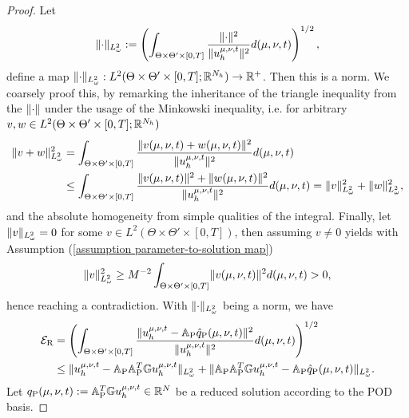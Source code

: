 \begin{proof}
    Let 
    \begin{equation*}
        \lVert \cdot \rVert_{L^2_\omega} := \left(\int_{\Theta \times \Theta' \times [0, T]} \frac{\lVert \cdot \rVert^2}{\lVert u_h^{\mu, \nu, t} \rVert^2} 
        d(\mu, \nu, t) \right)^{1/2},
    \end{equation*}
    define a map $\lVert \cdot \rVert_{L^2_\omega}: L^2(\Theta \times \Theta' \times [0, T]; \mathbb{R}^{N_h}) \to \mathbb{R}^+$. Then this is
    a norm. We coarsely proof this, by remarking the inheritance of the triangle inequality from the $\lVert \cdot \rVert$ under 
    the usage of the Minkowski inequality, i.e. for arbitrary $v, w \in L^2(\Theta \times \Theta' \times [0, T]; \mathbb{R}^{N_h})$
    \begin{align*}
        \lVert v + w \rVert_{L^2_\omega}^2 &= \int_{\Theta \times \Theta' \times [0, T]} 
        \frac{\lVert v(\mu, \nu, t) + w(\mu, \nu, t) \rVert^2}{\lVert u_h^{\mu, \nu, t} \rVert^2}
        d(\mu, \nu, t) \\
        &\leq  \int_{\Theta \times \Theta' \times [0, T]} 
        \frac{\lVert v(\mu, \nu, t) \rVert^2 + \lVert w(\mu, \nu, t) \rVert^2}{\lVert u_h^{\mu, \nu, t} \rVert^2}
        d(\mu, \nu, t) = \lVert v \rVert_{L^2_\omega}^2 + \lVert w \rVert_{L^2_\omega}^2,
    \end{align*}
    and the absolute homogeneity from simple qualities of the integral. Finally, let
    $\lVert v \rVert_{L^2_\omega} = 0$ for some $v \in L^2(\Theta \times \Theta' \times [0, T])$, then assuming $v \neq 0$ 
    yields with Assumption (\ref{assumption parameter-to-solution map})
    \begin{equation*}
        \lVert v \rVert_{L^2_\omega}^2 \geq  M^{-2} \int_{\Theta \times \Theta' \times [0, T]} \lVert v(\mu, \nu, t) \rVert^2 d(\mu, \nu, t) 
        > 0,
    \end{equation*}
    hence reaching a contradiction.
    With $\lVert  \cdot  \rVert_{L^2_\omega}$ being a norm, we have
    \begin{align}
        \mathcal{E}_\text{R} &= \left( \int_{\Theta \times \Theta' \times [0, T]} 
        \frac{\lVert u_h^{\mu, \nu, t} - \mathbb{A}_\text{P} \hat{q}_\text{P}(\mu, \nu, t) \rVert^2}{\lVert u_h^{\mu, \nu, t} \rVert^2} d(\mu, \nu, t) \right)^{1/2} \\ 
        \label{eq: decomposed errors poddnn}
        &\leq \lVert u_h^{\mu, \nu, t} - \mathbb{A}_\text{P} \mathbb{A}_\text{P}^T \mathbb{G} u_h^{\mu, \nu, t} \rVert_{L_\omega^2} + \lVert \mathbb{A}_\text{P} \mathbb{A}_\text{P}^T \mathbb{G} u_h^{\mu, \nu, t} - 
        \mathbb{A}_\text{P} \hat{q}_\text{P}(\mu, \nu, t) \rVert_{L^2_\omega}.
    \end{align}
    Let $q_\text{P}(\mu, \nu, t) := \mathbb{A}_\text{P}^T \mathbb{G} u_h^{\mu, \nu, t} \in \mathbb{R}^N$ be a reduced solution according to the POD basis. 

\end{proof}

